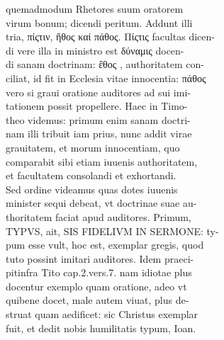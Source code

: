 \documentclass{article}
\begin{document}
\begin{pages}
                quemadmodum Rhetores suum oratorem \\
                virum bonum; dicendi peritum. Addunt illi \\
                tria, πίςτιν, ἤθος καί πάθος. Πίςτις facultas dicen- \\
                di vere illa in ministro est δύναμις docen- \\
                di sanam doctrinam:  ἔθος , authoritatem con- \\
                ciliat, id fit in Ecclesia vitae innocentia: πάθος \\
                vero si graui oratione auditores ad sui imi- \\
                tationem possit propellere. Haec in Timo- \\
                theo videmus: primum enim sanam doctri- \\
                nam illi tribuit iam prius, nunc addit virae \\
                grauitatem, et morum innocentiam, quo \\
                comparabit sibi etiam iuuenis authoritatem, \\
                et facultatem consolandi et exhortandi. \\
                Sed ordine videamus quas dotes iuuenis \\
                minister sequi debeat, vt doctrinae suae au- \\
                thoritatem faciat apud auditores. Primum, \\
                TYPVS, ait, SIS FIDELIVM IN SERMONE: ty- \\
                pum esse vult, hoc est, exemplar gregis, quod \\
                tuto possint imitari auditores. Idem praeci- \\
                pitinfra Tito cap.2.vers.7. nam idiotae plus \\
                docentur exemplo quam oratione, adeo vt \\
                quibene docet, male autem viuat, plus de- \\
                struat quam aedificet: sic Christus exemplar \\
                fuit, et dedit nobis humilitatis typum, Ioan. \\

\end{pages}
\end{document}
